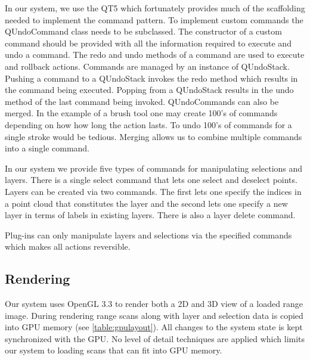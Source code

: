 In our system, we use the QT5 which fortunately provides much of the scaffolding needed to implement the command pattern. To implement custom commands the QUndoCommand class needs to be subclassed. The constructor of a custom command should be provided with all the information required to execute and undo a command. The redo and undo methods of a command are used to execute and rollback actions. Commands are managed by an instance of QUndoStack. Pushing a command to a QUndoStack invokes the redo method which results in the command being executed. Popping from a QUndoStack results in the undo method of the last command being invoked. QUndoCommands can also be merged. In the example of a brush tool one may create 100's of commands depending on how how long the action lasts. To undo 100's of commands for a single stroke would be tedious. Merging allows us to combine multiple commands into a single command.

In our system we provide five types of commands for manipulating selections and layers. There is a single select command that lets one select and deselect points. Layers can be created via two commands. The first lets one specify the indices in a point cloud that constitutes the layer and the second lets one specify a new layer in terms of labels in existing layers. There is also a layer delete command.

Plug-ins can only manipulate layers and selections via the specified commands which makes all actions reversible. 

\subsection{Rendering}
Our system uses OpenGL 3.3 to render both a 2D and 3D view of a loaded range image. During rendering range scans along with layer and selection data is copied into GPU memory (see \autoref{table:gpulayout}). All changes to the system state is kept synchronized with the GPU. No level of detail techniques are applied which limits our system to loading scans that can fit into GPU memory.

